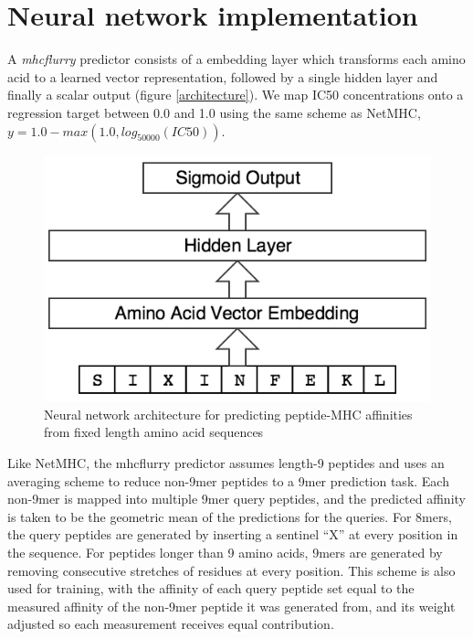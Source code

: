 \section{Neural network implementation}
A {\it mhcflurry} predictor consists of a embedding layer which transforms each amino acid to a learned vector representation, followed by a single hidden layer and finally a scalar output (figure \ref{architecture}). We map IC50 concentrations onto a regression target between 0.0 and 1.0 using the same scheme as NetMHC, $y = 1.0 - max(1.0, log_{50000}(IC50))$.

\begin{figure}[h]
\centering
\includegraphics[scale=0.5]{figures/mhcflurry-gliffy-network.png}
\caption{Neural network architecture for predicting peptide-MHC affinities from fixed length amino acid sequences}
\label{fig:architecture}
\end{figure}

Like NetMHC\cite{lundegaard2008accurate}, the mhcflurry predictor assumes length-9 peptides and uses an averaging scheme to reduce non-9mer peptides to a 9mer prediction task. Each non-9mer is mapped into multiple 9mer query peptides, and the predicted affinity is taken to be the geometric mean of the predictions for the queries. For 8mers, the query peptides are generated by inserting a sentinel ``X'' at every position in the sequence. For peptides longer than 9 amino acids, 9mers are generated by removing consecutive stretches of residues at every position. This scheme is also used for training, with the affinity of each query peptide set equal to the measured affinity of the non-9mer peptide it was generated from, and its weight adjusted so each measurement receives equal contribution.


